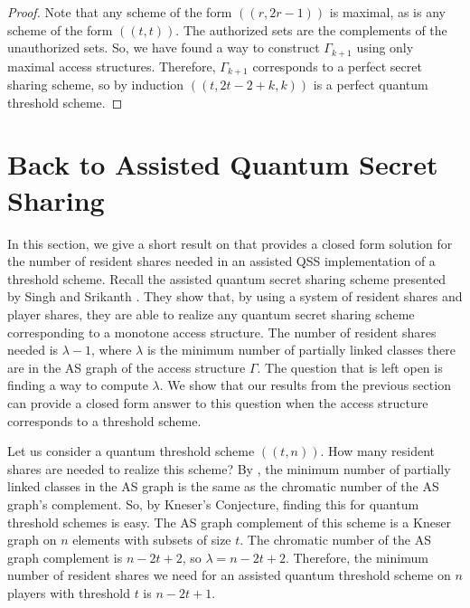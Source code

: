 \begin{proof}
    Note that any scheme of the form $((r,2r-1))$ is maximal, as is any scheme of the form $((t,t))$. The authorized sets are the complements of the unauthorized sets. So, we have found a way to construct $\Gamma_{k+1}$ using only maximal access structures. Therefore, $\Gamma_{k+1}$ corresponds to a perfect secret sharing scheme, so by induction $((t,2t-2+k,k))$ is a perfect quantum threshold scheme.
\end{proof}

\section{Back to Assisted Quantum Secret Sharing}
\label{sec:aqss-and-aqss}

In this section, we give a short result on that provides a closed form solution for the number of resident shares needed in an assisted QSS implementation of a threshold scheme. Recall the assisted quantum secret sharing scheme presented by Singh and Srikanth \cite{singh_assisted_2004}. They show that, by using a system of resident shares and player shares, they are able to realize any quantum secret sharing scheme corresponding to a monotone access structure. The number of resident shares needed is $\lambda-1$, where $\lambda$ is the minimum number of partially linked classes there are in the AS graph of the access structure $\Gamma$. The question that is left open is finding a way to compute $\lambda$. We show that our results from the previous section can provide a closed form answer to this question when the access structure corresponds to a threshold scheme.

Let us consider a quantum threshold scheme $((t,n))$. How many resident shares are needed to realize this scheme? By , the minimum number of partially linked classes in the AS graph is the same as the chromatic number of the AS graph's complement. So, by Kneser's Conjecture, finding this for quantum threshold schemes is easy. The AS graph complement of this scheme is a Kneser graph on $n$ elements with subsets of size $t$. The chromatic number of the AS graph complement is $n-2t+2$, so $\lambda = n-2t+2$. Therefore, the minimum number of resident shares we need for an assisted quantum threshold scheme on $n$ players with threshold $t$ is $n-2t+1$.